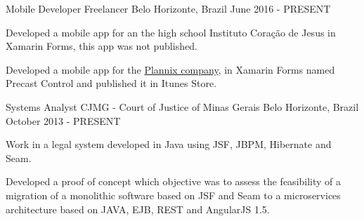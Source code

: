 

\begin{cventries}
  \cventry
    {Mobile Developer} %
    {Freelancer} %
    {Belo Horizonte, Brazil} %
    {June 2016 - PRESENT} %
    {
      \begin{cvitems} %
        \item {Developed a mobile app for an the high school Instituto Coração de Jesus in Xamarin Forms, this app was not published.}
        \item {Developed a mobile app for the \href{http://www.plannix.com.br}{Plannix company}, in Xamarin Forms named Precast Control and published it in Itunes Store.}
      \end{cvitems}
    }

  \cventry    
    {Systems Analyst} %
    {CJMG - Court of Justice of Minas Gerais} %
    {Belo Horizonte, Brazil} %
    {October 2013 - PRESENT} %
    {
      \begin{cvitems} %
        \item {Work in a legal system developed in Java using JSF, JBPM, Hibernate and Seam.}
        \item {Developed a proof of concept which objective was to assess the feasibility of a migration of a monolithic software based on JSF and Seam to a microservices architecture based on JAVA, EJB, REST and AngularJS 1.5.}
      \end{cvitems}
    }


\end{cventries}
